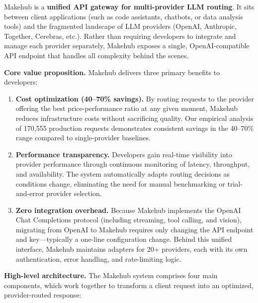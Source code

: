\documentclass[english]{article}
\begin{document}
Makehub is a \textbf{unified API gateway for multi-provider LLM routing}.
It sits between client applications (such as code assistants, chatbots, or data analysis tools) and the fragmented landscape of LLM providers (OpenAI, Anthropic, Together, Cerebras, etc.).
Rather than requiring developers to integrate and manage each provider separately, Makehub exposes a single, OpenAI-compatible API endpoint that handles all complexity behind the scenes.

\medskip

\noindent\textbf{Core value proposition.}
Makehub delivers three primary benefits to developers:

\begin{enumerate}
\item \textbf{Cost optimization (40--70\% savings).} By routing requests to the provider offering the best price-performance ratio at any given moment, Makehub reduces infrastructure costs without sacrificing quality. Our empirical analysis of 170,555 production requests demonstrates consistent savings in the 40--70\% range compared to single-provider baselines.

\item \textbf{Performance transparency.} Developers gain real-time visibility into provider performance through continuous monitoring of latency, throughput, and availability. The system automatically adapts routing decisions as conditions change, eliminating the need for manual benchmarking or trial-and-error provider selection.

\item \textbf{Zero integration overhead.} Because Makehub implements the OpenAI Chat Completions protocol (including streaming, tool calling, and vision), migrating from OpenAI to Makehub requires only changing the API endpoint and key—typically a one-line configuration change. Behind this unified interface, Makehub maintains adapters for 20+ providers, each with its own authentication, error handling, and rate-limiting logic.
\end{enumerate}

\medskip

\noindent\textbf{High-level architecture.}
The Makehub system comprises four main components, which work together to transform a client request into an optimized, provider-routed response:
\end{document}
